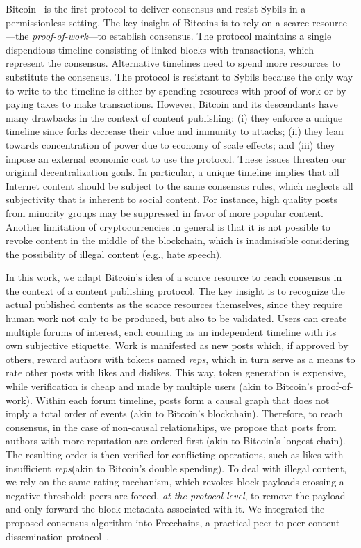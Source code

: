 \documentclass[10pt,journal,compsoc]{IEEEtran}
\newcommand{\FC}       {Freechains\xspace}
\newcommand{\reps}     {\emph{reps}\xspace}
\begin{document}
Bitcoin~\cite{p2p.bitcoin} is the first protocol to deliver consensus and
resist Sybils in a permissionless setting.
The key insight of Bitcoins is to rely on a scarce resource---the
\emph{proof-of-work}---to establish consensus.
The protocol maintains a single dispendious timeline consisting of linked
blocks with transactions, which represent the consensus.
Alternative timelines need to spend more resources to substitute the consensus.
The protocol is resistant to Sybils because the only way to write to the
timeline is either by spending resources with proof-of-work or by paying taxes
to make transactions.
%
However, Bitcoin and its descendants have many drawbacks in the context of
content publishing:
    (i)   they enforce a unique timeline since forks decrease their value and
          immunity to attacks;
    (ii)  they lean towards concentration of power due to economy of scale
          effects; and
    (iii) they impose an external economic cost to use the protocol.
These issues threaten our original decentralization goals.
In particular, a unique timeline implies that all Internet content should be
subject to the same consensus rules, which neglects all subjectivity that is
inherent to social content.
For instance, high quality posts from minority groups may be suppressed in
favor of more popular content.
Another limitation of cryptocurrencies in general is that it is not possible
to revoke content in the middle of the blockchain, which is inadmissible
considering the possibility of illegal content (e.g., hate speech).

In this work, we adapt Bitcoin's idea of a scarce resource to reach consensus
in the context of a content publishing protocol.
The key insight is to recognize the actual published contents as the scarce
resources themselves, since they require human work not only to be produced,
but also to be validated.
%
Users can create multiple forums of interest, each counting as an independent
timeline with its own subjective etiquette.
Work is manifested as new posts which, if approved by others, reward authors
with tokens named \reps, which in turn serve as a means to rate other posts
with likes and dislikes.
This way, token generation is expensive, while verification is cheap and made
by multiple users (akin to Bitcoin's proof-of-work).
%
Within each forum timeline, posts form a causal graph that does not imply a
total order of events (akin to Bitcoin's blockchain).
Therefore, to reach consensus, in the case of non-causal relationships, we
propose that posts from authors with more reputation are ordered first (akin to
Bitcoin's longest chain).
The resulting order is then verified for conflicting operations, such as likes
with insufficient \reps (akin to Bitcoin's double spending).
%
To deal with illegal content, we rely on the same rating mechanism, which
revokes block payloads crossing a negative threshold: peers are forced,
\emph{at the protocol level}, to remove the payload and only forward the block
metadata associated with it.
%
We integrated the proposed consensus algorithm into \FC, a practical
peer-to-peer content dissemination protocol~\cite{fcs.sbseg20}.
\end{document}
